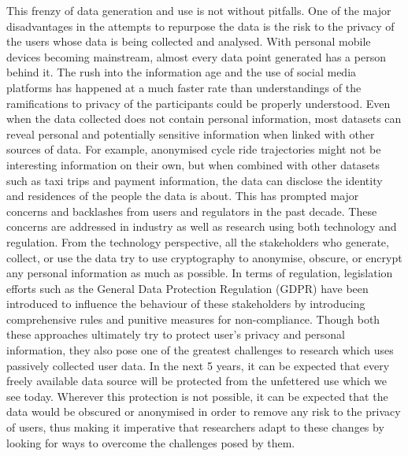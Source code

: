 This frenzy of data generation and use is not without pitfalls.
One of the major disadvantages in the attempts to repurpose the data is the risk  to the privacy of the users whose data is being collected and analysed.
With personal mobile devices becoming mainstream, almost every data point generated has a person behind it.
The rush into the information age and the use of social media platforms has happened at a much faster rate than understandings of the ramifications to privacy of the participants could be properly understood.
Even when the data collected does not contain personal information, most datasets can reveal personal and potentially sensitive information when linked with other sources of data.
For example, anonymised cycle ride trajectories might not  be interesting information on their own, but when combined with other datasets such as taxi trips and payment information, the data can disclose the identity and residences of the people the data is about.
This has prompted major concerns and backlashes from users and regulators in the past decade.
These concerns are addressed in industry as well as research using both technology and regulation.
From the technology perspective, all the stakeholders who generate, collect, or use the data try to use cryptography to anonymise, obscure, or encrypt any personal information as much as possible.
In terms of regulation, legislation efforts such as the General Data Protection Regulation (GDPR) have been introduced to influence the behaviour of these stakeholders by introducing comprehensive rules and punitive measures for non-compliance.
Though both these approaches ultimately try to protect user's privacy and personal information, they also pose one of the greatest challenges to research which uses passively collected user data.
In the next 5 years, it can be expected that every freely available data source will be protected from the unfettered use which we see today.
Wherever this protection is not possible, it can be expected that the data would be obscured or anonymised in order to remove any risk to the privacy of users, thus making it imperative that researchers adapt to these changes by looking for ways to overcome the challenges posed by them.

